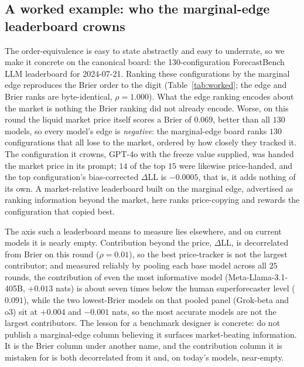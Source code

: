 \documentclass[11pt]{article}
\begin{document}
\subsection{A worked example: who the marginal-edge leaderboard crowns}
\label{sec:worked}
The order-equivalence is easy to state abstractly and easy to underrate, so we make it concrete on the canonical board: the 130-configuration ForecastBench LLM leaderboard for 2024-07-21. Ranking these configurations by the marginal edge reproduces the Brier order to the digit (Table~\ref{tab:worked}; the edge and Brier ranks are byte-identical, $\rho=1.000$). What the edge ranking encodes about the market is nothing the Brier ranking did not already encode. Worse, on this round the liquid market price itself scores a Brier of $0.069$, better than all $130$ models, so every model's edge is \emph{negative}: the marginal-edge board ranks $130$ configurations that all lose to the market, ordered by how closely they tracked it. The configuration it crowns, GPT-4o with the freeze value supplied, was handed the market price in its prompt; $14$ of the top $15$ were likewise price-handed, and the top configuration's bias-corrected $\Delta$LL is $-0.0005$, that is, it adds nothing of its own. A market-relative leaderboard built on the marginal edge, advertised as ranking information beyond the market, here ranks price-copying and rewards the configuration that copied best.

The axis such a leaderboard means to measure lies elsewhere, and on current models it is nearly empty. Contribution beyond the price, $\Delta$LL, is decorrelated from Brier on this round ($\rho=0.01$), so the best price-tracker is not the largest contributor; and measured reliably by pooling each base model across all $25$ rounds, the contribution of even the most informative model (Meta-Llama-3.1-405B, $+0.013$ nats) is about seven times below the human superforecaster level ($0.091$), while the two lowest-Brier models on that pooled panel (Grok-beta and o3) sit at $+0.004$ and $-0.001$ nats, so the most accurate models are not the largest contributors. The lesson for a benchmark designer is concrete: do not publish a marginal-edge column believing it surfaces market-beating information. It is the Brier column under another name, and the contribution column it is mistaken for is both decorrelated from it and, on today's models, near-empty.
\end{document}
